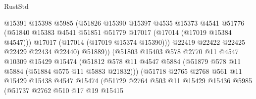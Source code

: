 \begin{lexlean}{RustStd}
\begin{coremodule}
{\begin{coremodule}
{{{{{{{{{{{{{{{{{{{{{{{{{{{{{{{{{{{{{{{{{{{{{{{{{{{{{{{                                  @15391
                                  @15398
                                  @5985
                                  (@51826
                                    @15390
                                    @15397
                                    @4535
                                    @15373
                                    @4541
                                    @51776
                                    (@51840
                                      @15383
                                      @4541
                                      @51851
                                      @51779
                                      @17017
                                      (@17014 (@17019 @15384 @4547)))
                                    @17017
                                    (@17014 (@17019 @15374 @15390)))
                                  @22419
                                  @22422
                                  @22425
                                  @22429
                                  @22434
                                  @22440)
                                @51889))
                            (@51803
                              @15403
                              @578
                              @2770
                              @11
                              @4547
                              @10309
                              @15429
                              @15474
                              (@51812
                                @578
                                @11
                                @4547
                                @5884
                                (@51879 @578 @11 @5884 (@51884 @575 @11 @5883 @21832)))
                              (@51718
                                @2765
                                @2768
                                @561
                                @11
                                @15429
                                @15438
                                @4547
                                @15474
                                (@51729
                                  @2764
                                  @503
                                  @11
                                  @15429
                                  @15436
                                  @5985
                                  (@51737
                                    @2762
                                    @510
                                    @17
                                    @19
                                    @15415
}}}}}}}}}}}}}}}}}}}}}}}}}}}}}}}}}}}}}}}}}}}}}}}}}}}}}}}
\end{coremodule}}
\end{coremodule}
\end{lexlean}
